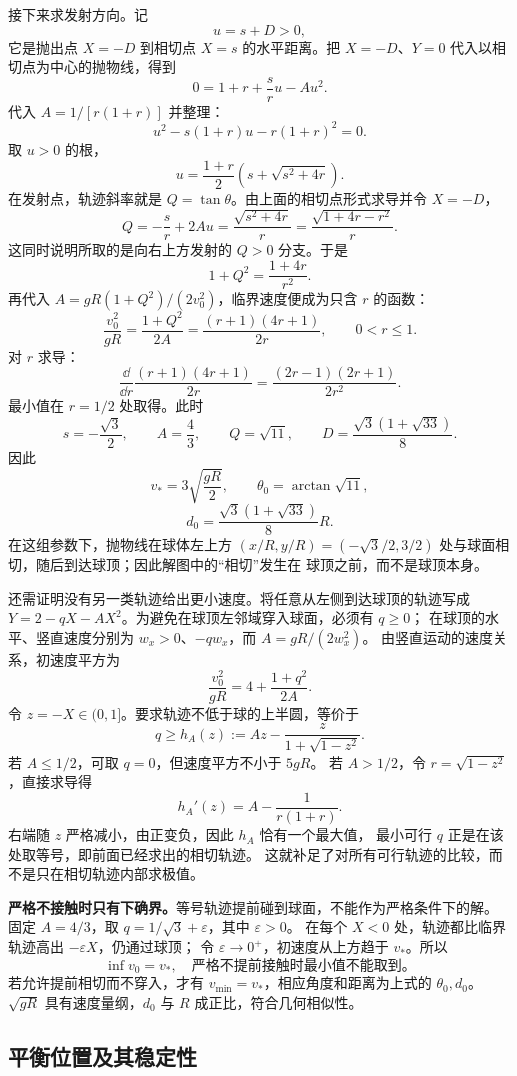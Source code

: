 \begin{xesolution}
接下来求发射方向。记
\[
 u=s+D>0,
\]
它是抛出点 $X=-D$ 到相切点 $X=s$ 的水平距离。把 $X=-D$、$Y=0$ 代入以相切点为中心的抛物线，得到
\[
 0=1+r+\frac{s}{r}u-Au^2.
\]
代入 $A=1/[r(1+r)]$ 并整理：
\[
 u^2-s(1+r)u-r(1+r)^2=0.
\]
取 $u>0$ 的根，
\[
 u=\frac{1+r}{2}\left(s+\sqrt{s^2+4r}\right).
\]
在发射点，轨迹斜率就是 $Q=\tan\theta$。由上面的相切点形式求导并令 $X=-D$，
\[
 Q=-\frac{s}{r}+2Au
 =\frac{\sqrt{s^2+4r}}{r}
 =\frac{\sqrt{1+4r-r^2}}{r}.
\]
这同时说明所取的是向右上方发射的 $Q>0$ 分支。于是
\[
 1+Q^2=\frac{1+4r}{r^2}.
\]
再代入 $A=gR(1+Q^2)/(2v_0^2)$，临界速度便成为只含 $r$ 的函数：
\[
 \frac{v_0^2}{gR}=\frac{1+Q^2}{2A}
 =\frac{(r+1)(4r+1)}{2r},\qquad 0<r\le1.
\]
对 $r$ 求导：
\[
 \frac{\dd}{\dd r}\frac{(r+1)(4r+1)}{2r}
 =\frac{(2r-1)(2r+1)}{2r^2}.
\]
最小值在 $r=1/2$ 处取得。此时
\[
 s=-\frac{\sqrt3}{2},\qquad A=\frac43,\qquad
 Q=\sqrt{11},\qquad
 D=\frac{\sqrt3(1+\sqrt{33})}{8}.
\]
因此
\[
 \boxed{v_*=3\sqrt{\frac{gR}{2}}},\qquad
 \boxed{\theta_0=\arctan\sqrt{11}},
\]
\[
 \boxed{d_0=\frac{\sqrt3(1+\sqrt{33})}{8}R}.
\]
\soldiagOneNine
在这组参数下，抛物线在球体左上方
$(x/R,y/R)=(-\sqrt3/2,3/2)$ 处与球面相切，随后到达球顶；因此解图中的“相切”发生在
球顶之前，而不是球顶本身。

还需证明没有另一类轨迹给出更小速度。将任意从左侧到达球顶的轨迹写成
$Y=2-qX-AX^2$。为避免在球顶左邻域穿入球面，必须有 $q\ge0$；
在球顶的水平、竖直速度分别为 $w_x>0$、$-qw_x$，而 $A=gR/(2w_x^2)$。
由竖直运动的速度关系，初速度平方为
\[
 \frac{v_0^2}{gR}=4+\frac{1+q^2}{2A}.
\]
令 $z=-X\in(0,1]$。要求轨迹不低于球的上半圆，等价于
\[
 q\ge h_A(z):=Az-\frac{z}{1+\sqrt{1-z^2}}.
\]
若 $A\le1/2$，可取 $q=0$，但速度平方不小于 $5gR$。
若 $A>1/2$，令 $r=\sqrt{1-z^2}$，直接求导得
\[
 h_A'(z)=A-\frac1{r(1+r)}.
\]
右端随 $z$ 严格减小，由正变负，因此 $h_A$ 恰有一个最大值，
最小可行 $q$ 正是在该处取等号，即前面已经求出的相切轨迹。
这就补足了对所有可行轨迹的比较，而不是只在相切轨迹内部求极值。

\textbf{严格不接触时只有下确界。}等号轨迹提前碰到球面，不能作为严格条件下的解。
固定 $A=4/3$，取 $q=1/\sqrt3+\varepsilon$，其中 $\varepsilon>0$。
在每个 $X<0$ 处，轨迹都比临界轨迹高出 $-\varepsilon X$，仍通过球顶；
令 $\varepsilon\to0^+$，初速度从上方趋于 $v_*$。所以
\[
 \boxed{\inf v_0=v_*,\quad\text{严格不提前接触时最小值不能取到。}}
\]
若允许提前相切而不穿入，才有 $v_{\min}=v_*$，相应角度和距离为上式的 $\theta_0,d_0$。
$\sqrt{gR}$ 具有速度量纲，$d_0$ 与 $R$ 成正比，符合几何相似性。
\end{xesolution}

\subsection{平衡位置及其稳定性}

